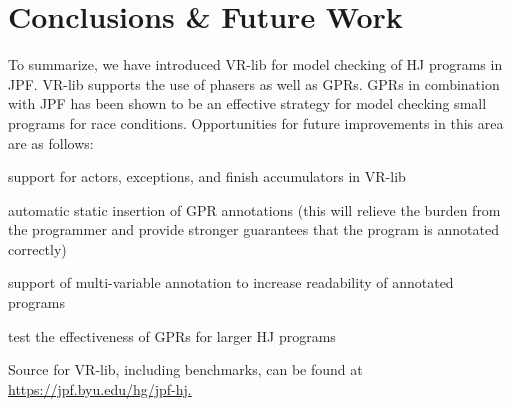 \section{Conclusions \& Future Work}

To summarize, we have introduced VR-lib for model checking of HJ programs in JPF.
VR-lib supports the use of phasers as well as GPRs. GPRs in combination with JPF
has been shown to be an effective strategy for model checking small programs for
race conditions. Opportunities for future improvements in this area are as follows:
\begin{compactitem}
\item support for actors, exceptions, and finish accumulators in VR-lib
\item automatic static insertion of GPR annotations (this will relieve the
burden from the programmer and provide stronger guarantees that the program is
annotated correctly)
\item support of multi-variable annotation to increase readability of annotated
programs
\item test the effectiveness of GPRs for larger HJ programs
\end{compactitem}
Source for VR-lib, including benchmarks, can be found at
\url{https://jpf.byu.edu/hg/jpf-hj.}

